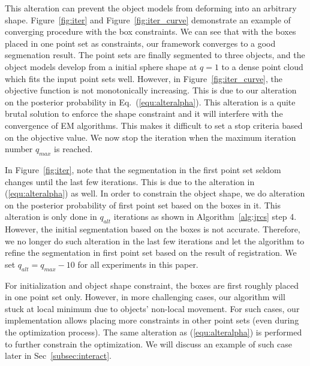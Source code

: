 This alteration can prevent the object models from deforming into an arbitrary shape.
%
%
Figure~\ref{fig:iter} and Figure~\ref{fig:iter_curve} demonstrate an example of converging procedure with the box constraints. 
%
We can see that with the boxes placed in one point set as constraints, our framework converges to a good segmenation result. The point sets are finally segmented to three objects, and the object models develop from a initial sphere shape at $q=1$ to a dense point cloud which fits the input point sets well. 
%
However, in Figure~\ref{fig:iter_curve}, the objective function is not monotonically increasing. 
This is due to our alteration on the posterior probability in Eq.~(\ref{equ:alteralpha}). This alteration is a quite brutal solution to enforce the shape constraint and it will interfere with the convergence of EM algorithms.
% 
This makes it difficult to set a stop criteria based on the objective value. 
We now stop the iteration when the maximum iteration number $q_{max}$ is reached.
 
In Figure~\ref{fig:iter}, note that the segmentation in the first point set seldom changes until the last few iterations. 
%
This is due to the alteration in (\ref{equ:alteralpha}) as well. 
%
In order to constrain the object shape, we do alteration on the posterior probability of first point set based on the boxes in it. This alteration is only done in $q_{alt}$ iterations as shown in Algorithm~\ref{alg:jrcs} step 4. 
However, the initial segmentation based on the boxes is not accurate. 
Therefore, we no longer do such alteration in the last few iterations and let the algorithm to refine the segmentation in first point set based on the result of registration. 
We set $q_{alt}=q_{max}-10$ for all experiments in this paper.

For initialization and object shape constraint, the boxes are first roughly placed in one point set only. 
However, in more challenging cases, our algorithm will stuck at local minimum due to objects' non-local movement. 
For such cases, our implementation allows placing more constraints in other point sets (even during the optimization process). 
The same alteration as (\ref{equ:alteralpha}) is performed to further constrain the optimization. We will discuss an example of such case later in Sec~\ref{subsec:interact}.